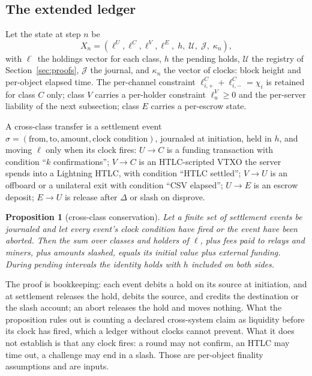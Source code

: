 \documentclass[11pt]{article}
\theoremstyle{plain}
\newtheorem{proposition}{Proposition}
\theoremstyle{definition}
\theoremstyle{remark}
\begin{document}
\subsection{The extended ledger}

Let the state at step $n$ be
\[
X_n=(\ell^U,\ell^C,\ell^V,\ell^E,\;h,\;\mathcal U,\;\mathcal J,\;\kappa_n),
\]
with $\ell^{\cdot}$ the holdings vector for each class, $h$ the pending holds, $\mathcal U$ the registry of Section~\ref{sec:proofs}, $\mathcal J$ the journal, and $\kappa_n$ the vector of clocks: block height and per-object elapsed time. The per-channel constraint $\ell^C_{i,+}+\ell^C_{i,-}=\chi_i$ is retained for class $C$ only; class $V$ carries a per-holder constraint $\ell^V_u\ge 0$ and the per-server liability of the next subsection; class $E$ carries a per-escrow state.

A cross-class transfer is a settlement event $\sigma=(\text{from},\text{to},\text{amount},\text{clock condition})$, journaled at initiation, held in $h$, and moving $\ell$ only when its clock fires: $U\to C$ is a funding transaction with condition ``$k$ confirmations''; $V\to C$ is an HTLC-scripted VTXO the server spends into a Lightning HTLC, with condition ``HTLC settled''; $V\to U$ is an offboard or a unilateral exit with condition ``CSV elapsed''; $U\to E$ is an escrow deposit; $E\to U$ is release after $\Delta$ or slash on disprove.

\begin{proposition}[cross-class conservation]
\label{prop:conservation}
Let a finite set of settlement events be journaled and let every event's clock condition have fired or the event have been aborted. Then the sum over classes and holders of $\ell$, plus fees paid to relays and miners, plus amounts slashed, equals its initial value plus external funding. During pending intervals the identity holds with $h$ included on both sides.
\end{proposition}

The proof is bookkeeping: each event debits a hold on its source at initiation, and at settlement releases the hold, debits the source, and credits the destination or the slash account; an abort releases the hold and moves nothing. What the proposition rules out is counting a declared cross-system claim as liquidity before its clock has fired, which a ledger without clocks cannot prevent. What it does not establish is that any clock fires: a round may not confirm, an HTLC may time out, a challenge may end in a slash. Those are per-object finality assumptions and are inputs.
\end{document}

